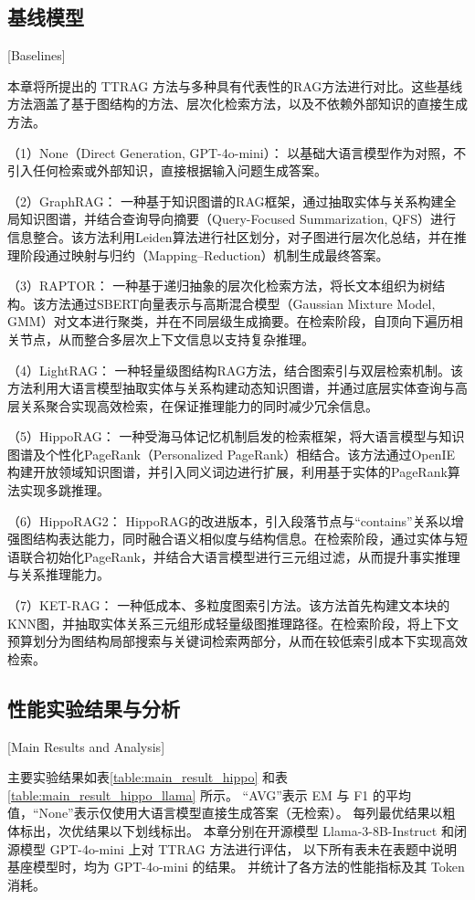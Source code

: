 \subsection{基线模型}[Baselines]

本章将所提出的 TTRAG 方法与多种具有代表性的RAG方法进行对比。这些基线方法涵盖了基于图结构的方法、层次化检索方法，以及不依赖外部知识的直接生成方法。

（1）None（Direct Generation, GPT-4o-mini）：
以基础大语言模型作为对照，不引入任何检索或外部知识，直接根据输入问题生成答案。

（2）GraphRAG\cite{graphrag}：
一种基于知识图谱的RAG框架，通过抽取实体与关系构建全局知识图谱，并结合查询导向摘要（Query-Focused Summarization, QFS）进行信息整合。该方法利用Leiden算法进行社区划分，对子图进行层次化总结，并在推理阶段通过映射与归约（Mapping–Reduction）机制生成最终答案。

（3）RAPTOR\cite{raptor}：
一种基于递归抽象的层次化检索方法，将长文本组织为树结构。该方法通过SBERT向量表示与高斯混合模型（Gaussian Mixture Model, GMM）对文本进行聚类，并在不同层级生成摘要。在检索阶段，自顶向下遍历相关节点，从而整合多层次上下文信息以支持复杂推理。

（4）LightRAG\cite{lightrag}：
一种轻量级图结构RAG方法，结合图索引与双层检索机制。该方法利用大语言模型抽取实体与关系构建动态知识图谱，并通过底层实体查询与高层关系聚合实现高效检索，在保证推理能力的同时减少冗余信息。

（5）HippoRAG\cite{hipporag}：
一种受海马体记忆机制启发的检索框架，将大语言模型与知识图谱及个性化PageRank（Personalized PageRank）相结合。该方法通过OpenIE构建开放领域知识图谱，并引入同义词边进行扩展，利用基于实体的PageRank算法实现多跳推理。

（6）HippoRAG2\cite{hipporag2}：
HippoRAG的改进版本，引入段落节点与“contains”关系以增强图结构表达能力，同时融合语义相似度与结构信息。在检索阶段，通过实体与短语联合初始化PageRank，并结合大语言模型进行三元组过滤，从而提升事实推理与关系推理能力。

（7）KET-RAG\cite{ketrag}：
一种低成本、多粒度图索引方法。该方法首先构建文本块的KNN图，并抽取实体关系三元组形成轻量级图推理路径。在检索阶段，将上下文预算划分为图结构局部搜索与关键词检索两部分，从而在较低索引成本下实现高效检索。

\subsection{性能实验结果与分析}[Main Results and Analysis]

主要实验结果如表\ref{table:main_result_hippo} 和表\ref{table:main_result_hippo_llama} 所示。
“AVG”表示 EM 与 F1 的平均值，“None”表示仅使用大语言模型直接生成答案（无检索）。
每列最优结果以粗体标出，次优结果以下划线标出。
本章分别在开源模型 Llama-3-8B-Instruct 和闭源模型 GPT-4o-mini 上对 TTRAG 方法进行评估，
以下所有表未在表题中说明基座模型时，均为 GPT-4o-mini 的结果。
并统计了各方法的性能指标及其 Token 消耗。


